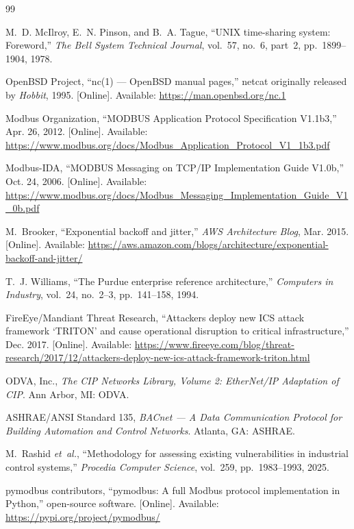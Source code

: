\documentclass[10pt,conference]{IEEEtran}
\begin{document}
\begin{thebibliography}{99}

M.~D. McIlroy, E.~N. Pinson, and B.~A. Tague, ``UNIX time-sharing
system: Foreword,'' \emph{The Bell System Technical Journal}, vol.~57,
no.~6, part~2, pp.~1899--1904, 1978.

OpenBSD Project, ``nc(1) --- OpenBSD manual pages,'' netcat originally
released by \emph{Hobbit}, 1995. [Online]. Available:
\url{https://man.openbsd.org/nc.1}

Modbus Organization, ``MODBUS Application Protocol Specification
V1.1b3,'' Apr. 26, 2012. [Online]. Available:
\url{https://www.modbus.org/docs/Modbus_Application_Protocol_V1_1b3.pdf}

Modbus-IDA, ``MODBUS Messaging on TCP/IP Implementation Guide V1.0b,''
Oct. 24, 2006. [Online]. Available:
\url{https://www.modbus.org/docs/Modbus_Messaging_Implementation_Guide_V1_0b.pdf}

M.~Brooker, ``Exponential backoff and jitter,'' \emph{AWS Architecture
Blog}, Mar. 2015. [Online]. Available:
\url{https://aws.amazon.com/blogs/architecture/exponential-backoff-and-jitter/}

T.~J. Williams, ``The Purdue enterprise reference architecture,''
\emph{Computers in Industry}, vol.~24, no.~2--3, pp.~141--158, 1994.

FireEye/Mandiant Threat Research, ``Attackers deploy new ICS attack
framework `TRITON' and cause operational disruption to critical
infrastructure,'' Dec. 2017. [Online]. Available:
\url{https://www.fireeye.com/blog/threat-research/2017/12/attackers-deploy-new-ics-attack-framework-triton.html}

ODVA, Inc., \emph{The CIP Networks Library, Volume 2: EtherNet/IP
Adaptation of CIP}. Ann Arbor, MI: ODVA.

ASHRAE/ANSI Standard 135, \emph{BACnet --- A Data Communication
Protocol for Building Automation and Control Networks}. Atlanta, GA:
ASHRAE.

M.~Rashid \emph{et~al.}, ``Methodology for assessing existing
vulnerabilities in industrial control systems,'' \emph{Procedia
Computer Science}, vol.~259, pp.~1983--1993, 2025.

pymodbus contributors, ``pymodbus: A full Modbus protocol implementation
in Python,'' open-source software. [Online]. Available:
\url{https://pypi.org/project/pymodbus/}


\end{thebibliography}
\end{document}
